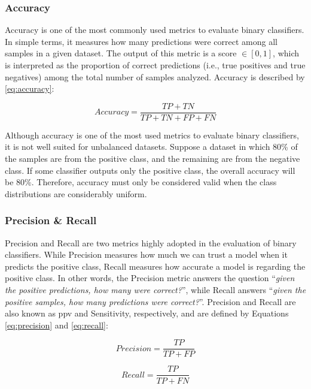 \subsubsection{Accuracy}

Accuracy is one of the most commonly used metrics to evaluate binary classifiers. In simple terms, it measures how many predictions were correct among all samples in a given dataset. The output of this metric is a score $\in [0, 1]$, which is interpreted as the proportion of correct predictions (i.e., true positives and true negatives) among the total number of samples analyzed. Accuracy is described by \autoref{eq:accuracy}:

\begin{equation}
\label{eq:accuracy}
Accuracy = \frac{TP + TN}{TP + TN + FP + FN}
\end{equation}

Although accuracy is one of the most used metrics to evaluate binary classifiers, it is not well suited for unbalanced datasets. Suppose a dataset in which 80\% of the samples are from the positive class, and the remaining are from the negative class. If some classifier outputs only the positive class, the overall accuracy will be 80\%. Therefore, accuracy must only be considered valid when the class distributions are considerably uniform.

\subsubsection{Precision \& Recall} \label{precision-recall}

Precision and Recall are two metrics highly adopted in the evaluation of binary classifiers. While Precision measures how much we can trust a model when it predicts the positive class, Recall measures how accurate a model is regarding the positive class. In other words, the Precision metric answers the question ``\textit{given the positive predictions, how many were correct?}'', while Recall answers ``\textit{given the positive samples, how many predictions were correct?}''. Precision and Recall are also known as \acf{ppv} and Sensitivity, respectively, and are defined by Equations \ref{eq:precision} and \ref{eq:recall}: 

\begin{equation}
\label{eq:precision}
Precision = \frac{TP}{TP + FP}
\end{equation}

\begin{equation}
\label{eq:recall}
Recall = \frac{TP}{TP + FN}
\end{equation}

